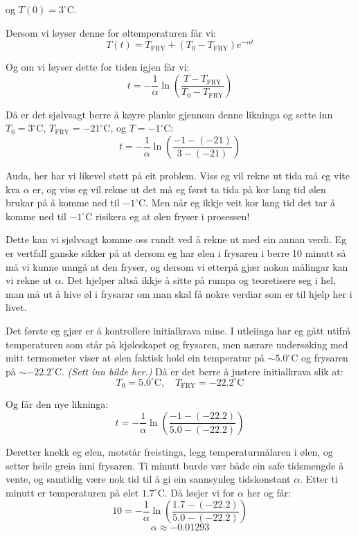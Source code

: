 \documentclass[a4paper,12pt]{article}
\begin{document}
og $T(0) = 3^\circ$C.

Dersom vi løyser denne for øltemperaturen får vi:
\[
T(t) = T_\text{FRY} + (T_0 - T_\text{FRY})e^{-\alpha t}
\]

Og om vi løyser dette for tiden igjen får vi:
\[
t = -\frac{1}{\alpha} \ln\left(\frac{T - T_\text{FRY}}{T_0 - T_\text{FRY}}\right)
\]

Då er det sjølvsagt berre å køyre planke gjennom denne likninga og sette inn $T_0 = 3^\circ$C, $T_\text{FRY} = -21^\circ$C, og $T = -1^\circ$C:
\[
t = -\frac{1}{\alpha} \ln\left(\frac{-1 - (-21)}{3 - (-21)}\right)
\]

\vspace{0.8cm}

Auda, her har vi likevel støtt på eit problem. Viss eg vil rekne ut tida må eg vite kva $\alpha$ er, og viss eg vil rekne ut det må eg først ta tida på kor lang tid ølen brukar på å komme ned til $-1^\circ$C. Men når eg ikkje veit kor lang tid det tar å komme ned til $-1^\circ$C risikera eg at ølen fryser i prosessen!

Dette kan vi sjølvsagt komme oss rundt ved å rekne ut med ein annan verdi. Eg er vertfall ganske sikker på at dersom eg har ølen i frysaren i berre 10 minutt så må vi kunne unngå at den fryser, og dersom vi etterpå gjær nokon målingar kan vi rekne ut $\alpha$. Det hjelper altså ikkje å sitte på rumpa og teoretisere seg i hel, man må ut å hive øl i frysarar om man skal få nokre verdiar som er til hjelp her i livet.

Det første eg gjær er å kontrollere initialkrava mine. I utleiinga har eg gått utifrå temperaturen som står på kjøleskapet og frysaren, men nærare undersøking med mitt termometer viser at ølen faktisk hold ein temperatur på $\sim 5.0^\circ$C og frysaren på $\sim -22.2^\circ$C. \emph{(Sett inn bilde her.)} Då er det berre å justere initialkrava slik at:
\[
T_0 = 5.0^\circ\text{C}, \quad T_\text{FRY} = -22.2^\circ\text{C}
\]

Og får den nye likninga:
\[
t = -\frac{1}{\alpha} \ln\left(\frac{-1 - (-22.2)}{5.0 - (-22.2)}\right)
\]

Deretter knekk eg ølen, motstår freistinga, legg temperaturmålaren i ølen, og setter heile greia inni frysaren. Ti minutt burde vær både ein safe tidsmengde å vente, og samtidig være nok tid til å gi ein sannsynleg tidskonstant $\alpha$. Etter ti minutt er temperaturen på ølet $1.7^\circ$C. Då løsjer vi for $\alpha$ her og får:
\[
10 = -\frac{1}{\alpha} \ln\left(\frac{1.7 - (-22.2)}{5.0 - (-22.2)}\right)
\]
\[
\alpha \approx -0.01293
\]
\end{document}

